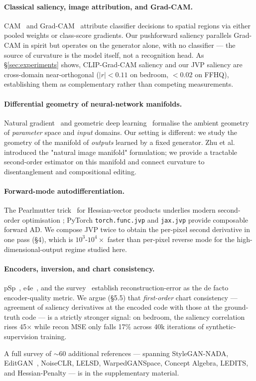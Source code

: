 \paragraph{Classical saliency, image attribution, and Grad-CAM.}
CAM~\cite{Zhou2016CAM} and Grad-CAM~\cite{Selvaraju2017GradCAM}
attribute classifier decisions to spatial regions via either pooled
weights or class-score gradients. Our pushforward saliency parallels
Grad-CAM in spirit but operates on the generator alone, with no
classifier --- the source of curvature is the model itself, not a
recognition head. As §\ref{sec:experiments} shows, CLIP-Grad-CAM
saliency and our JVP saliency are cross-domain near-orthogonal
($|r| < 0.11$ on bedroom, $< 0.02$ on FFHQ), establishing them as
complementary rather than competing measurements.

\paragraph{Differential geometry of neural-network manifolds.}
Natural gradient~\cite{Amari1998NaturalGradient} and geometric deep
learning~\cite{Bronstein2021GeometricDL} formalise the ambient
geometry of \emph{parameter} space and \emph{input} domains. Our
setting is different: we study the geometry of the manifold of
\emph{outputs} learned by a fixed generator. Zhu et
al.~\cite{Zhu2016ManipulationOnManifold} introduced the "natural
image manifold" formulation; we provide a tractable second-order
estimator on this manifold and connect curvature to disentanglement
and compositional editing.

\paragraph{Forward-mode autodifferentiation.}
The Pearlmutter trick~\cite{Pearlmutter1994HVP} for Hessian-vector
products underlies modern second-order optimisation
\cite{Martens2015KFAC}; PyTorch \texttt{torch.func.jvp} and
\texttt{jax.jvp} provide composable forward AD. We compose JVP twice
to obtain the per-pixel second derivative in one pass (§4), which is
$10^3$-$10^4 \times$ faster than per-pixel reverse mode for the
high-dimensional-output regime studied here.

\paragraph{Encoders, inversion, and chart consistency.}
pSp~\cite{Richardson2021pSp}, e4e~\cite{Tov2021e4e}, and the
survey~\cite{Xia2022InversionSurvey} establish reconstruction-error
as the de facto encoder-quality metric. We argue (§5.5) that
\emph{first-order} chart consistency --- agreement of saliency
derivatives at the encoded code with those at the ground-truth code
--- is a strictly stronger signal: on bedroom, the saliency
correlation rises 45$\times$ while recon MSE only falls 17\% across
40k iterations of synthetic-supervision training.

A full survey of $\sim$60 additional references --- spanning
StyleGAN-NADA, EditGAN~\cite{Ling2021EditGAN}, NoiseCLR, LELSD,
WarpedGANSpace, Concept Algebra, LEDITS, and Hessian-Penalty --- is
in the supplementary material.
